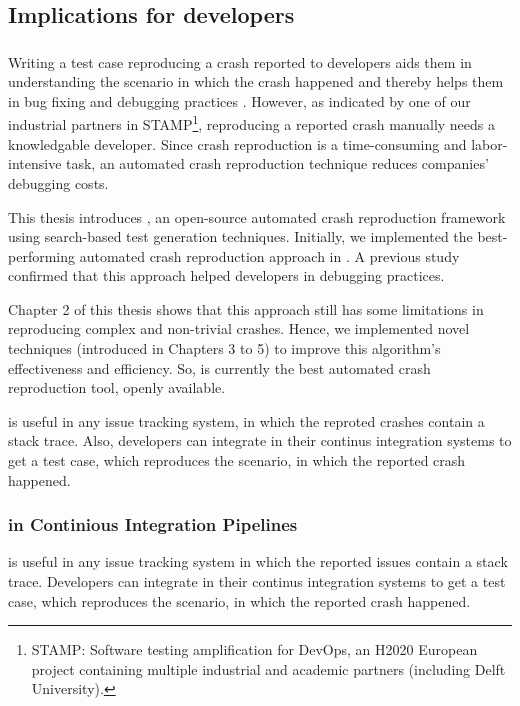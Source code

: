 \subsection{Implications for developers}

\subsubsection{\botsing}

Writing a test case reproducing a crash reported to developers aids them in understanding the scenario in which the crash happened and thereby helps them in bug fixing and debugging practices \cite{Zeller2009}. However, as indicated by one of our industrial partners in STAMP\footnote{STAMP: Software testing amplification for DevOps, an H2020 European project containing multiple industrial and academic partners (including Delft University).}, reproducing a reported crash manually needs a knowledgable developer. Since crash reproduction is a time-consuming and labor-intensive task, an automated crash reproduction technique reduces companies' debugging costs.

This thesis introduces \botsing, an open-source automated crash reproduction framework using search-based test generation techniques. 
Initially, we implemented the best-performing automated crash reproduction approach \cite{Soltani2018a} in \botsing. A previous study confirmed that this approach helped developers in debugging practices.

Chapter 2 of this thesis shows that this approach still has some limitations in reproducing complex and non-trivial crashes. Hence, we implemented novel techniques (introduced in Chapters 3 to 5) to improve this algorithm's effectiveness and efficiency. So, \botsing is currently the best automated crash reproduction tool, openly available.


\botsing is useful in any issue tracking system, in which the reproted crashes contain a stack trace. Also, developers can integrate \botsing in their continus integration systems to get a test case, which reproduces the scenario, in which the reported crash happened.


\subsubsection{\botsing in Continious Integration Pipelines}
\botsing is useful in any issue tracking system in which the reported issues contain a stack trace. Developers can integrate \botsing in their continus integration systems to get a test case, which reproduces the scenario, in which the reported crash happened.

